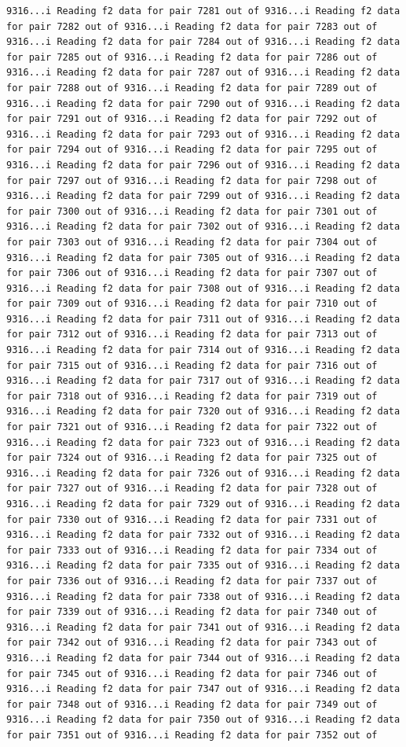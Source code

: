 \documentclass[
]{article}
\begin{document}
\begin{verbatim}
9316...i Reading f2 data for pair 7281 out of 9316...i Reading f2 data for pair 7282 out of 9316...i Reading f2 data for pair 7283 out of 9316...i Reading f2 data for pair 7284 out of 9316...i Reading f2 data for pair 7285 out of 9316...i Reading f2 data for pair 7286 out of 9316...i Reading f2 data for pair 7287 out of 9316...i Reading f2 data for pair 7288 out of 9316...i Reading f2 data for pair 7289 out of 9316...i Reading f2 data for pair 7290 out of 9316...i Reading f2 data for pair 7291 out of 9316...i Reading f2 data for pair 7292 out of 9316...i Reading f2 data for pair 7293 out of 9316...i Reading f2 data for pair 7294 out of 9316...i Reading f2 data for pair 7295 out of 9316...i Reading f2 data for pair 7296 out of 9316...i Reading f2 data for pair 7297 out of 9316...i Reading f2 data for pair 7298 out of 9316...i Reading f2 data for pair 7299 out of 9316...i Reading f2 data for pair 7300 out of 9316...i Reading f2 data for pair 7301 out of 9316...i Reading f2 data for pair 7302 out of 9316...i Reading f2 data for pair 7303 out of 9316...i Reading f2 data for pair 7304 out of 9316...i Reading f2 data for pair 7305 out of 9316...i Reading f2 data for pair 7306 out of 9316...i Reading f2 data for pair 7307 out of 9316...i Reading f2 data for pair 7308 out of 9316...i Reading f2 data for pair 7309 out of 9316...i Reading f2 data for pair 7310 out of 9316...i Reading f2 data for pair 7311 out of 9316...i Reading f2 data for pair 7312 out of 9316...i Reading f2 data for pair 7313 out of 9316...i Reading f2 data for pair 7314 out of 9316...i Reading f2 data for pair 7315 out of 9316...i Reading f2 data for pair 7316 out of 9316...i Reading f2 data for pair 7317 out of 9316...i Reading f2 data for pair 7318 out of 9316...i Reading f2 data for pair 7319 out of 9316...i Reading f2 data for pair 7320 out of 9316...i Reading f2 data for pair 7321 out of 9316...i Reading f2 data for pair 7322 out of 9316...i Reading f2 data for pair 7323 out of 9316...i Reading f2 data for pair 7324 out of 9316...i Reading f2 data for pair 7325 out of 9316...i Reading f2 data for pair 7326 out of 9316...i Reading f2 data for pair 7327 out of 9316...i Reading f2 data for pair 7328 out of 9316...i Reading f2 data for pair 7329 out of 9316...i Reading f2 data for pair 7330 out of 9316...i Reading f2 data for pair 7331 out of 9316...i Reading f2 data for pair 7332 out of 9316...i Reading f2 data for pair 7333 out of 9316...i Reading f2 data for pair 7334 out of 9316...i Reading f2 data for pair 7335 out of 9316...i Reading f2 data for pair 7336 out of 9316...i Reading f2 data for pair 7337 out of 9316...i Reading f2 data for pair 7338 out of 9316...i Reading f2 data for pair 7339 out of 9316...i Reading f2 data for pair 7340 out of 9316...i Reading f2 data for pair 7341 out of 9316...i Reading f2 data for pair 7342 out of 9316...i Reading f2 data for pair 7343 out of 9316...i Reading f2 data for pair 7344 out of 9316...i Reading f2 data for pair 7345 out of 9316...i Reading f2 data for pair 7346 out of 9316...i Reading f2 data for pair 7347 out of 9316...i Reading f2 data for pair 7348 out of 9316...i Reading f2 data for pair 7349 out of 9316...i Reading f2 data for pair 7350 out of 9316...i Reading f2 data for pair 7351 out of 9316...i Reading f2 data for pair 7352 out of 
\end{verbatim}
\end{document}
